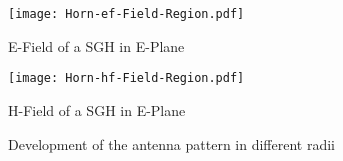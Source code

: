 \begin{figure}
\centering
\texttt{[image: Horn-ef-Field-Region.pdf]}
\caption{E-Field of a \ac{SGH} in E-Plane}
\label{fig:eplaneef}
\end{figure}
\begin{figure}
\centering
\texttt{[image: Horn-hf-Field-Region.pdf]}
\caption{H-Field of a \ac{SGH} in E-Plane}
\label{fig:eplaneef}
\end{figure}

\begin{figure}
  \centering
  \centering
\caption{Development of the antenna pattern in different radii}
\label{fig:devantennap}
\end{figure}